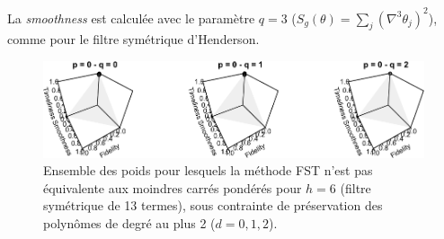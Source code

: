 \documentclass[
  11pt,
  french,
  a4paper]{article}
\newcommand\1{\mathds{1}}
\begin{document}
La \emph{smoothness} est calculée avec le paramètre \(q=3\) (\(S_g(\theta) = \sum_{j}(\nabla^{3}\theta_{j})^{2}\)), comme pour le filtre symétrique d'Henderson.

\begin{figure}[H]

{\centering \includegraphics{img/bookdown/pdf/thhendersonh6-1} 

}

\caption[Ensemble des poids pour lesquels la méthode FST n'est pas équivalente aux moindres carrés pondérés pour \(h=6\) (filtre symétrique de 13 termes), sous contrainte de préservation des polynômes de degré au plus 2 (\(d=0,1,2\))]{Ensemble des poids pour lesquels la méthode FST n'est pas équivalente aux moindres carrés pondérés pour \(h=6\) (filtre symétrique de 13 termes), sous contrainte de préservation des polynômes de degré au plus 2 (\(d=0,1,2\)).}\label{fig:thhendersonh6}

\footnotesize
\normalsize\end{figure}
\end{document}
